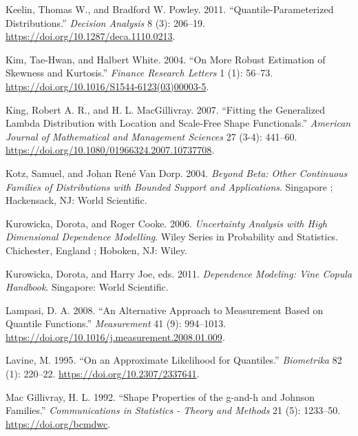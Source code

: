 \documentclass[
]{interact}
\newlength{\cslhangindent}
\newenvironment{CSLReferences}[2] %
 {\begin{list}{}{%
  \setlength{\itemindent}{0pt}
  \setlength{\leftmargin}{0pt}
  \setlength{\parsep}{0pt}
  \ifodd #1
   \setlength{\leftmargin}{\cslhangindent}
   \setlength{\itemindent}{-1\cslhangindent}
  \fi
  \setlength{\itemsep}{#2\baselineskip}}}
 {\end{list}}
\begin{document}
\begin{CSLReferences}{1}{0}
Keelin, Thomas W., and Bradford W. Powley. 2011.
{``Quantile-{Parameterized Distributions}.''} \emph{Decision Analysis} 8
(3): 206--19. \url{https://doi.org/10.1287/deca.1110.0213}.

Kim, Tae-Hwan, and Halbert White. 2004. {``On More Robust Estimation of
Skewness and Kurtosis.''} \emph{Finance Research Letters} 1 (1): 56--73.
\url{https://doi.org/10.1016/S1544-6123(03)00003-5}.

King, Robert A. R., and H. L. MacGillivray. 2007. {``Fitting the
{Generalized Lambda Distribution} with {Location} and {Scale-Free Shape
Functionals}.''} \emph{American Journal of Mathematical and Management
Sciences} 27 (3-4): 441--60.
\url{https://doi.org/10.1080/01966324.2007.10737708}.

Kotz, Samuel, and Johan René Van Dorp. 2004. \emph{Beyond Beta: Other
Continuous Families of Distributions with Bounded Support and
Applications}. Singapore ; Hackensack, NJ: World Scientific.

Kurowicka, Dorota, and Roger Cooke. 2006. \emph{Uncertainty Analysis
with High Dimensional Dependence Modelling}. Wiley Series in Probability
and Statistics. Chichester, England ; Hoboken, NJ: Wiley.

Kurowicka, Dorota, and Harry Joe, eds. 2011. \emph{Dependence Modeling:
Vine Copula Handbook}. Singapore: World Scientific.

Lampasi, D. A. 2008. {``An Alternative Approach to Measurement Based on
Quantile Functions.''} \emph{Measurement} 41 (9): 994--1013.
\url{https://doi.org/10.1016/j.measurement.2008.01.009}.

Lavine, M. 1995. {``On an {Approximate Likelihood} for {Quantiles}.''}
\emph{Biometrika} 82 (1): 220--22.
\url{https://doi.org/10.2307/2337641}.

Mac Gillivray, H. L. 1992. {``Shape Properties of the g-and-h and
Johnson Families.''} \emph{Communications in Statistics - Theory and
Methods} 21 (5): 1233--50. \url{https://doi.org/bcmdwc}.


\end{CSLReferences}
\end{document}
